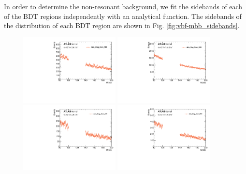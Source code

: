 \label{sec:vbf-nonres}

In order to determine the non-resonant background, we fit  the sidebands of each of the BDT regions independently with an analytical function. The sidebands of the \Mbb{}  distribution of each BDT region are shown in Fig. \ref{fig:vbf-mbb_sidebands}. %

\begin{figure}[htbp]
  \centering
 \includegraphics[width=0.45\textwidth]{figures/VBF/Mbb_SRI_2cen.pdf}
 \includegraphics[width=0.45\textwidth]{figures/VBF/Mbb_SRII_2cen.pdf}\\
 \includegraphics[width=0.45\textwidth]{figures/VBF/Mbb_SRI_4cen.pdf}
 \includegraphics[width=0.45\textwidth]{figures/VBF/Mbb_SRII_4cen.pdf}\\

\end{figure}

